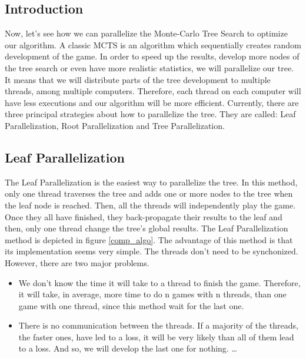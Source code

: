 \label{third part}
\subsection{Introduction}

Now, let’s see how we can parallelize the Monte-Carlo Tree Search to optimize our algorithm. A classic MCTS is an algorithm which sequentially creates random development of the game. In order to speed up the results, develop more nodes of the tree search or even have more realistic statistics, we will parallelize our tree. It means that we will distribute parts of the tree development to multiple threads, among multiple computers. Therefore, each thread on each computer will have less executions and our algorithm will be more efficient.
\newline
\newline
Currently, there are three principal strategies about how to parallelize the tree. They are called: Leaf Parallelization, Root Parallelization and Tree Parallelization\cite{parallel_comp, master_mcts_kozeleck}.

\subsection{Leaf Parallelization}

The Leaf Parallelization is the easiest way to parallelize the tree. In this method, only one thread traverses the tree and adds one or more nodes to the tree when the leaf node is reached. Then, all the threads will independently play the game. Once they all have finished, they back-propagate their results to the leaf and then, only one thread change the tree’s global results. The Leaf Parallelization method is depicted in figure \ref{comp_algo}.
\newline
\newline
The advantage of this method is that its implementation seems very simple. The threads don't need to be synchonized. However, there are two major problems.
\begin{itemize}
     \item We don’t know the time it will take to a thread to finish the game. Therefore, it will take, in average, more time to do n games with n threads, than one game with one thread, since this method wait for the last one.
     \item There is no communication between the threads. If a majority of the threads, the faster ones, have led to a loss, it will be very likely than all of them lead to a loss. And so, we will develop the last one for nothing. \ldots
  \end{itemize}


